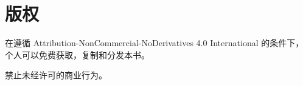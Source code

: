 \chapter{版权}

在遵循 Attribution-NonCommercial-NoDerivatives 4.0 International 的条件下，
个人可以免费获取，复制和分发本书。

禁止未经许可的商业行为。
